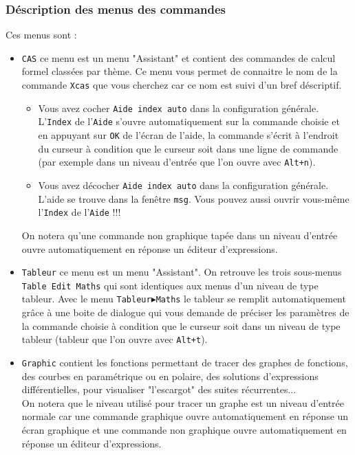 \documentclass[a4paper,11pt]{article}
\begin{document}
\subsubsection{D\'escription des menus des commandes}
Ces menus sont :
\begin{itemize} 
\item
{\tt CAS} ce menu est un menu "Assistant" et contient des commandes de calcul
formel class\'ees par th\`eme. Ce menu vous 
permet de connaitre le nom de la commande {\tt Xcas} que vous cherchez car ce 
nom est suivi d'un bref d\'escriptif. 
\begin{itemize}
\item Vous avez cocher {\tt Aide index auto} dans la configuration 
g\'en\'erale. L'{\tt Index} de l'{\tt Aide} s'ouvre automatiquement sur la 
commande choisie et en appuyant sur {\tt OK} de l'\'ecran 
de l'aide, la commande s'\'ecrit \`a l'endroit du curseur \`a condition que 
le curseur soit dans une ligne de commande (par exemple dans un niveau 
d'entr\'ee que l'on ouvre avec {\tt Alt+n}).
\item Vous avez d\'ecocher {\tt Aide index auto} dans la configuration 
g\'en\'erale. L'aide se trouve dans la fen\^etre {\tt msg}. Vous pouvez aussi 
ouvrir vous-m\^eme l'{\tt Index} de l'{\tt Aide} !!!
\end{itemize}
On notera  qu'une commande non graphique tap\'ee dans un niveau d'entr\'ee 
ouvre automatiquement en r\'eponse un \'editeur d'expressions.

\item
{\tt Tableur} ce menu est un menu "Assistant". On retrouve les trois sous-menus
{\tt Table Edit Maths} qui sont identiques aux menus d'un niveau de type 
tableur. Avec le menu {\tt Tableur$\blacktriangleright$Maths} le tableur se
remplit automatiquement gr\^ace \`a une
boite de dialogue qui vous demande de pr\'eciser les param\`etres de la 
commande choisie \`a condition que le curseur soit dans un niveau de type
 tableur (tableur que l'on ouvre avec {\tt Alt+t}).
\item
{\tt Graphic} contient les fonctions permettant de tracer des graphes de 
fonctions, des courbes en param\'etrique ou en polaire, des
solutions d'expressions diff\'erentielles, pour visualiser
"l'escargot" des suites r\'ecurrentes...\\
On notera que le niveau utilis\'e pour tracer un graphe est un niveau 
d'entr\'ee normale car une commande graphique ouvre automatiquement en 
r\'eponse un \'ecran graphique et une commande non graphique ouvre 
automatiquement en r\'eponse un \'editeur d'expressions.


\end{itemize}
\end{document}
